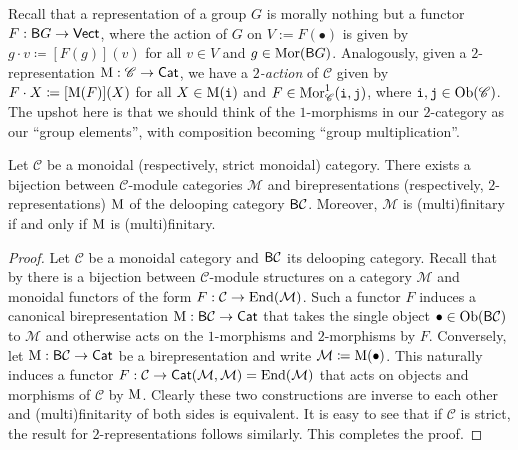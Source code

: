 \noindent\begin{remark} Recall that a representation of a group $G$ is morally nothing but a functor\linebreak $F : \textnormal{\textsf{B}}G \to \textnormal{\textsf{Vect}}$, where the action of $G$ on $V := F(\bullet)$ is given by $g \cdot v \coloneqq [F(g)](v)$ for all $v \in V$ and $g \in \textnormal{Mor}(\textnormal{\textsf{B}}G)$. Analogously, given a $2$-representation $\textup{M} : \mathscr{C} \to \textnormal{\textsf{Cat}}$, we have a {\em $2$-action} of $\mathscr{C}$ given by $F \cdot X \coloneqq [\textup{M}(F)](X)$ for all $X \in \textup{M}(\textnormal{\texttt{i}})$ and $F \in \textnormal{Mor}_\mathscr{C}^1(\textnormal{\texttt{i}}, \textnormal{\texttt{j}})$, where $\textnormal{\texttt{i}}, \textnormal{\texttt{j}} \in \textnormal{Ob}(\mathscr{C})$. The upshot here is that we should think of the $1$-morphisms in our $2$-category as our ``group elements'', with composition becoming ``group multiplication''.\\ %
\end{remark}

\noindent\begin{proposition}\label{ModuleBireps} Let $\mathcal{C}$ be a monoidal (respectively, strict monoidal) category. There exists a bijection between $\mathcal{C}$-module categories $\mathcal{M}$ and birepresentations (respectively, $2$-representations) $\textup{M}$ of the delooping category $\textnormal{\textsf{B}}\mathcal{C}$. Moreover, $\mathcal{M}$ is (multi)finitary if and only if $\textup{M}$ is (multi)finitary.\\
\end{proposition}

\noindent\begin{proof} Let $\mathcal{C}$ be a monoidal category and $\textnormal{\textsf{B}}\mathcal{C}$ its delooping category. Recall that by \cite[Proposition 7.1.3]{EGNO16} there is a bijection between $\mathcal{C}$-module structures on a category $\mathcal{M}$ and monoidal functors of the form $F : \mathcal{C} \to \textup{End}(\mathcal{M})$. Such a functor $F$ induces a canonical birepresentation $\textup{M} : \textnormal{\textsf{B}}\mathcal{C} \to \textnormal{\textsf{Cat}}$ that takes the single object $\bullet \in \textnormal{Ob}(\textnormal{\textsf{B}}\mathcal{C})$ to $\mathcal{M}$ and otherwise acts on the $1$-morphisms and $2$-morphisms by $F$. Conversely, let $\textup{M} : \textnormal{\textsf{B}}\mathcal{C} \to \textnormal{\textsf{Cat}}$ be a birepresentation and write $\mathcal{M} \coloneqq \textup{M}(\bullet)$. This naturally induces a functor $F : \mathcal{C} \to \textnormal{\textsf{Cat}}(\mathcal{M}, \mathcal{M}) = \textup{End}(\mathcal{M})$ that acts on objects and morphisms of $\mathcal{C}$ by $\textup{M}$. Clearly these two constructions are inverse to each other and (multi)finitarity of both sides is equivalent. It is easy to see that if $\mathcal{C}$ is strict, the result for $2$-representations follows similarly. This completes the proof.
\end{proof}\\

